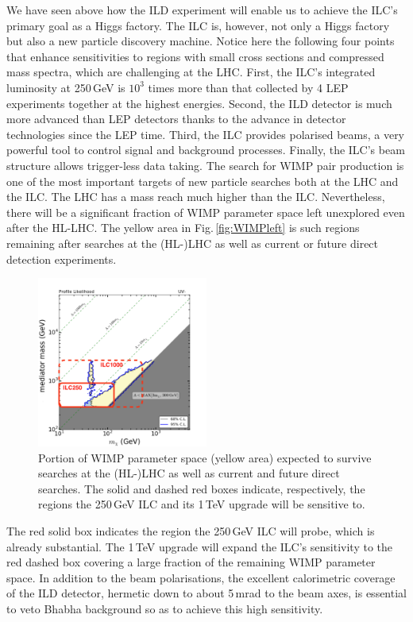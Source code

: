 We have seen above how the ILD experiment will enable us to achieve the ILC's primary goal as a Higgs factory. The ILC is, however, not only a Higgs factory but also a new particle discovery machine. Notice here the following four points that enhance sensitivities to regions with small cross sections and compressed mass spectra, which are challenging at the LHC. First, the ILC's integrated luminosity at 250\,GeV is $10^3$ times more than that collected by 4 LEP experiments together at the highest energies. Second, the ILD detector is much more advanced than LEP detectors thanks to the advance in detector technologies since the LEP time. Third, the ILC provides polarised beams, a very powerful tool to control signal and background processes. Finally, the ILC's beam structure allows trigger-less data taking. The search for WIMP pair production is one of the most important targets of new particle searches both at the LHC and the ILC. The LHC has a mass reach much higher than the ILC. Nevertheless, there will be a significant fraction of WIMP parameter space left unexplored even after the HL-LHC. The yellow area in Fig.\,\ref{fig:WIMPleft} is such regions remaining after searches at the (HL-)LHC as well as current or future direct detection experiments\cite{Habermehl:2017dxh}.
\begin{figure}[htbp]
\begin{center}
 \includegraphics[width=0.5\textwidth]{Science/fig/UVminus_mx_lam_far_2ilc.pdf}
\end{center}
\caption{Portion of WIMP parameter space (yellow area) expected to survive searches at the (HL-)LHC as well as current and future direct searches. The solid and dashed red boxes indicate, respectively, the regions the 250\,GeV ILC and its 1\,TeV upgrade will be sensitive to\cite{Ref:ilcWIMP}.
}
\label{fig:ilcWIMP}
\end{figure}
The red solid box indicates the region the 250\,GeV ILC will probe, which is already substantial. The 1\,TeV upgrade will expand the ILC's sensitivity to the red dashed box covering a large fraction of the remaining WIMP parameter space\cite{Ref:ilcWIMP}. In addition to the beam polarisations, the excellent calorimetric coverage of the ILD detector, hermetic down to about 5\,mrad to the beam axes, is essential to veto Bhabha background so as to achieve this high sensitivity. 


